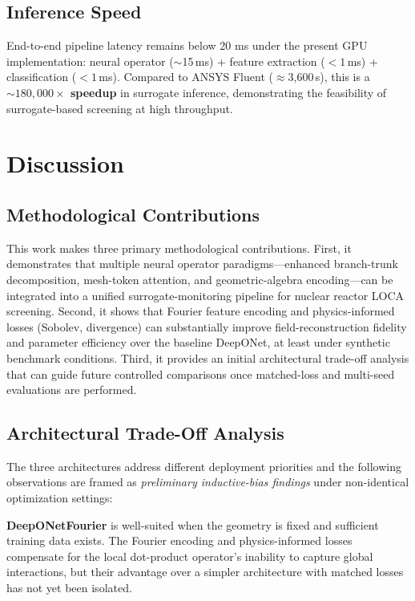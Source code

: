 \documentclass[conference]{IEEEtran}
\begin{document}
\subsection{Inference Speed}

End-to-end pipeline latency remains below 20 ms under the present GPU implementation: neural operator ($\sim$15\,ms) + feature extraction ($< 1$\,ms) + classification ($< 1$\,ms). Compared to ANSYS Fluent ($\approx$3,600\,s), this is a \textbf{${\sim}180{,}000\times$ speedup} in surrogate inference, demonstrating the feasibility of surrogate-based screening at high throughput.

\section{Discussion}
\label{sec:discussion}

\subsection{Methodological Contributions}

This work makes three primary methodological contributions. First, it demonstrates that multiple neural operator paradigms---enhanced branch-trunk decomposition, mesh-token attention, and geometric-algebra encoding---can be integrated into a unified surrogate-monitoring pipeline for nuclear reactor LOCA screening. Second, it shows that Fourier feature encoding and physics-informed losses (Sobolev, divergence) can substantially improve field-reconstruction fidelity and parameter efficiency over the baseline DeepONet, at least under synthetic benchmark conditions. Third, it provides an initial architectural trade-off analysis that can guide future controlled comparisons once matched-loss and multi-seed evaluations are performed.

\subsection{Architectural Trade-Off Analysis}

The three architectures address different deployment priorities and the following observations are framed as \emph{preliminary inductive-bias findings} under non-identical optimization settings:

\textbf{DeepONetFourier} is well-suited when the geometry is fixed and sufficient training data exists. The Fourier encoding and physics-informed losses compensate for the local dot-product operator's inability to capture global interactions, but their advantage over a simpler architecture with matched losses has not yet been isolated.
\end{document}

